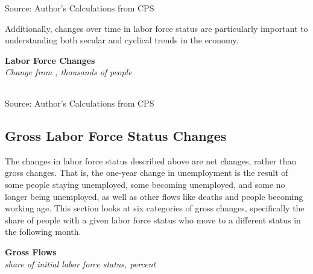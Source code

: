 \documentclass{report}
\begin{document}
{\begin{minipage}{0.76\textwidth}
\footnotesize{Source: Author's Calculations from CPS}
\vspace{2mm}

\small Additionally, changes over time in labor force status are particularly important to understanding both secular and cyclical trends in the economy. 
\vspace{1mm}

\normalsize \textbf{Labor Force Changes}\\
\footnotesize{\textit{Change from \unskip, thousands of people}}\\
\noindent {} \setlength{\tabcolsep}{3.0pt} \color{black!90}
		{\renewcommand{\arraystretch}{1.52}
		 \begin{tabular}{p{27.8mm} R{11.2mm} R{10.4mm} R{10.4mm} R{10.2mm} 
		 				 R{10.6mm} R{10.4mm} R{10.4mm}}
			  \hline
		\end{tabular}}
		\vspace{-2mm}
		
\footnotesize{Source: Author's Calculations from CPS}
\end{minipage}
\newpage
\subsection*{\color{black!70} \seriffont Gross Labor Force Status Changes}
\begin{minipage}{0.76\textwidth}
\small The changes in labor force status described above are net changes, rather than gross changes. That is, the one-year change in unemployment is the result of some people staying unemployed, some becoming unemployed, and some no longer being unemployed, as well as other flows like deaths and people becoming working age. This section looks at six categories of gross changes, specifically the share of people with a given labor force status who move to a different status in the following month. 
\end{minipage}
\vspace{2mm}

\normalsize \textbf{Gross Flows}\\
\footnotesize{\textit{share of initial labor force status, percent}}

}
\end{document}
